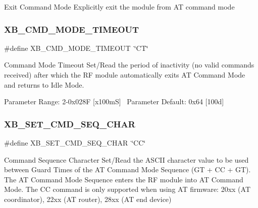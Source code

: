 Exit Command Mode Explicitly exit the module from AT command mode \mbox{\label{group___a_t_command_options_ga44b29b82d01677566af011179946866f}} 
\subsubsection{\texorpdfstring{X\+B\+\_\+\+C\+M\+D\+\_\+\+M\+O\+D\+E\+\_\+\+T\+I\+M\+E\+O\+UT}{XB\_CMD\_MODE\_TIMEOUT}}
{\footnotesize\ttfamily \#define X\+B\+\_\+\+C\+M\+D\+\_\+\+M\+O\+D\+E\+\_\+\+T\+I\+M\+E\+O\+UT~\char`\"{}CT\char`\"{}}

Command Mode Timeout Set/\+Read the period of inactivity (no valid commands received) after which the RF module automatically exits AT Command Mode and returns to Idle Mode.

Parameter Range\+: 2-\/0x028F \mbox{[}x100mS\mbox{]}~\newline
Parameter Default\+: 0x64 \mbox{[}100d\mbox{]} \mbox{\label{group___a_t_command_options_gaaa54d14d569183034d941ef1e82dc3e5}} 
\subsubsection{\texorpdfstring{X\+B\+\_\+\+S\+E\+T\+\_\+\+C\+M\+D\+\_\+\+S\+E\+Q\+\_\+\+C\+H\+AR}{XB\_SET\_CMD\_SEQ\_CHAR}}
{\footnotesize\ttfamily \#define X\+B\+\_\+\+S\+E\+T\+\_\+\+C\+M\+D\+\_\+\+S\+E\+Q\+\_\+\+C\+H\+AR~\char`\"{}CC\char`\"{}}

Command Sequence Character Set/\+Read the A\+S\+C\+II character value to be used between Guard Times of the AT Command Mode Sequence (GT + CC + GT). The AT Command Mode Sequence enters the RF module into AT Command Mode. The CC command is only supported when using AT firmware\+: 20xx (AT coordinator), 22xx (AT router), 28xx (AT end device)

